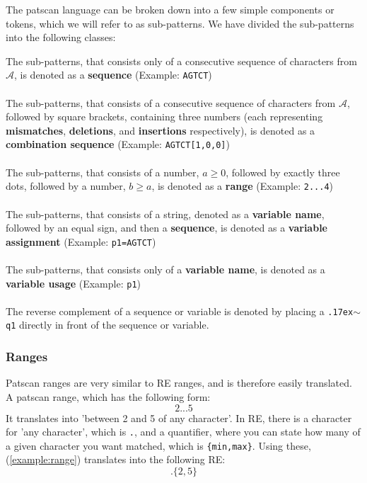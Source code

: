 \documentclass[12pt]{article}
\theoremstyle{definition}
\begin{document}
The patscan language can be broken down into a few simple components or tokens, which we will refer to as sub-patterns. We have divided the sub-patterns into the following classes:

\begin{definition}
The sub-patterns, that consists only of a consecutive sequence of characters from $\mathcal{A}$, is denoted as a \textbf{sequence} (Example: \texttt{AGTCT})
\\\\
The sub-patterns, that consists of a consecutive sequence of characters from $\mathcal{A}$, followed by square brackets, containing three numbers (each representing \textbf{mismatches}, \textbf{deletions}, and \textbf{insertions} respectively), is denoted as a \textbf{combination sequence} (Example: \texttt{AGTCT[1,0,0]})
\\\\
The sub-patterns, that consists of a number, $a \geq 0$, followed by exactly three dots, followed by a number, $b \geq a$, is denoted as a \textbf{range} (Example: \texttt{2...4})
\\\\
The sub-patterns, that consists of a string, denoted as a \textbf{variable name}, followed by an equal sign, and then a \textbf{sequence}, is denoted as a \textbf{variable assignment} (Example: \texttt{p1=AGTCT})
\\\\
The sub-patterns, that consists only of a \textbf{variable name}, is denoted as a \textbf{variable usage} (Example: \texttt{p1})
\\\\
The reverse complement of a sequence or variable is denoted by placing a \texttt{{\raise.17ex\hbox{$\scriptstyle\mathtt{\sim}$}}q1} directly in front of the sequence or variable.
\end{definition}

\subsubsection{Ranges}

Patscan ranges are very similar to RE ranges, and is therefore easily translated. A patscan range, which has the following form:
\begin{equation}
\label{example:range}
	2...5
\end{equation}
It translates into 'between 2 and 5 of any character'. In RE, there is a character for 'any character', which is \texttt{.}, and a quantifier, where you can state how many of a given character you want matched, which is \texttt{\{min,max\}}. Using these, (\ref{example:range}) translates into the following RE:
\begin{equation}
.\{2,5\}
\end{equation}
\end{document}
